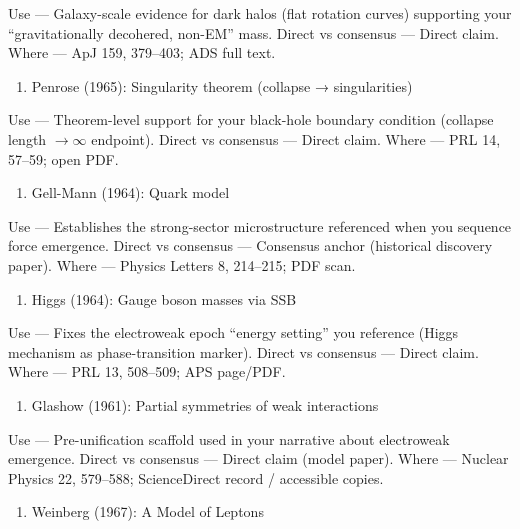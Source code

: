 \documentclass[
]{article}
\providecommand{\tightlist}{%
  \setlength{\itemsep}{0pt}\setlength{\parskip}{0pt}}
\begin{document}
Use --- Galaxy-scale evidence for dark halos (flat rotation curves)
supporting your ``gravitationally decohered, non-EM'' mass. Direct vs
consensus --- Direct claim. Where --- ApJ 159, 379--403; ADS full text.

\begin{enumerate}
\def\labelenumi{\arabic{enumi})}
\setcounter{enumi}{7}
\tightlist
\item
  Penrose (1965): Singularity theorem (collapse → singularities)
\end{enumerate}

Use --- Theorem-level support for your black-hole boundary condition
(collapse length \(\to \infty\) endpoint). Direct vs consensus ---
Direct claim. Where --- PRL 14, 57--59; open PDF.

\begin{enumerate}
\def\labelenumi{\arabic{enumi})}
\setcounter{enumi}{8}
\tightlist
\item
  Gell-Mann (1964): Quark model
\end{enumerate}

Use --- Establishes the strong-sector microstructure referenced when you
sequence force emergence. Direct vs consensus --- Consensus anchor
(historical discovery paper). Where --- Physics Letters 8, 214--215; PDF
scan.

\begin{enumerate}
\def\labelenumi{\arabic{enumi})}
\setcounter{enumi}{9}
\tightlist
\item
  Higgs (1964): Gauge boson masses via SSB
\end{enumerate}

Use --- Fixes the electroweak epoch ``energy setting'' you reference
(Higgs mechanism as phase-transition marker). Direct vs consensus ---
Direct claim. Where --- PRL 13, 508--509; APS page/PDF.

\begin{enumerate}
\def\labelenumi{\arabic{enumi})}
\setcounter{enumi}{10}
\tightlist
\item
  Glashow (1961): Partial symmetries of weak interactions
\end{enumerate}

Use --- Pre-unification scaffold used in your narrative about
electroweak emergence. Direct vs consensus --- Direct claim (model
paper). Where --- Nuclear Physics 22, 579--588; ScienceDirect record /
accessible copies.

\begin{enumerate}
\def\labelenumi{\arabic{enumi})}
\setcounter{enumi}{11}
\tightlist
\item
  Weinberg (1967): A Model of Leptons
\end{enumerate}
\end{document}
